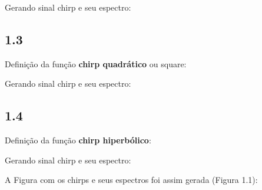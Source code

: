Gerando sinal chirp e seu espectro:


\subsection*{1.3} 
%
Definição da função \textbf{chirp quadrático} ou square:


Gerando sinal chirp e seu espectro:


\subsection*{1.4}
%
Definição da função \textbf{chirp hiperbólico}:


Gerando sinal chirp e seu espectro:


A Figura com os chirps e seus espectros foi assim gerada (Figura 1.1):



